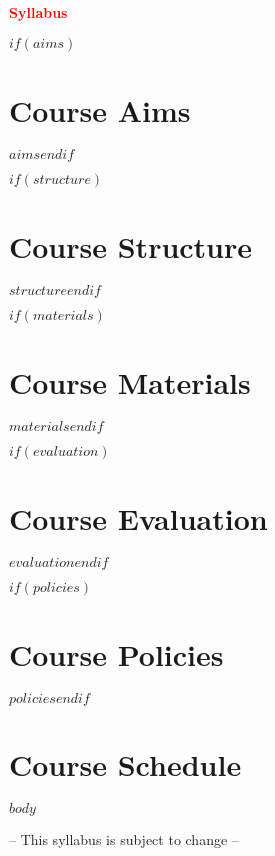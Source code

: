 \documentclass[11pt,a4paper]{article}
\begin{document}
\textbf{\textcolor{red}{Syllabus}}	

$if(aims)$\section*{Course Aims}

$aims$$endif$

$if(structure)$\section*{Course Structure}

$structure$$endif$

$if(materials)$\section*{Course Materials}

$materials$$endif$

$if(evaluation)$\section*{Course Evaluation}

$evaluation$$endif$

$if(policies)$\section*{Course Policies}

$policies$$endif$


\section*{Course Schedule}

$body$

\centering
	-- This syllabus is subject to change --
	
\end{document}
